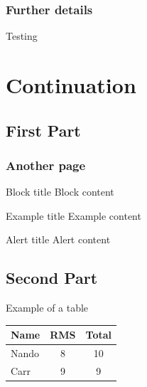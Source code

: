 \documentclass{beamer}
\begin{document}
\begin{frame}\frametitle{Further details}
Testing
\end{frame}


\section[Cont]{Continuation}
\begin{frame}[plain]
    \tableofcontents[currentsection]
\end{frame}

\subsection[First]{First Part}
\begin{frame}\frametitle{Another page}

    \begin{block}{Block title}
    Block content
    \end{block}

    \begin{example}{Example title}
    Example content
    \end{example}

    \begin{alertblock}{Alert title}
    Alert content
    \end{alertblock}

\end{frame}


\subsection[Second]{Second Part}
\begin{frame}{Example of a table}
    \begin{center}
        \begin{tabular}{l c c}
        \bf Name & \bf RMS & \bf Total \\
        \hline
        Nando & 8 & 10 \\
        Carr & 9 & 9 \\
        \hline
        \end{tabular}
    \end{center}
\end{frame}
\end{document}
